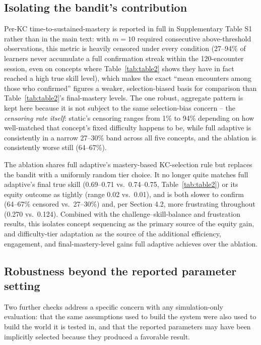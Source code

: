 \documentclass[11pt]{article}
\begin{document}
\subsection{Isolating the bandit's contribution}

Per-KC time-to-sustained-mastery is reported in full in Supplementary Table S1 rather than in the main text: with $m{=}10$ required consecutive above-threshold observations, this metric is heavily censored under every condition (27--94\% of learners never accumulate a full confirmation streak within the 120-encounter session, even on concepts where Table~\ref{tab:table2} shows they have in fact reached a high true skill level), which makes the exact ``mean encounters among those who confirmed'' figures a weaker, selection-biased basis for comparison than Table~\ref{tab:table2}'s final-mastery levels. The one robust, aggregate pattern is kept here because it is not subject to the same selection-bias concern -- the \textit{censoring rate itself}: static's censoring ranges from 1\% to 94\% depending on how well-matched that concept's fixed difficulty happens to be, while full adaptive is consistently in a narrow 27--30\% band across all five concepts, and the ablation is consistently worse still (64--67\%).

The ablation shares full adaptive's mastery-based KC-selection rule but replaces the bandit with a uniformly random tier choice. It no longer quite matches full adaptive's final true skill (0.69--0.71 vs.\ 0.74--0.75, Table~\ref{tab:table2}) or its equity outcome as tightly (range 0.02 vs.\ 0.01), and is both slower to confirm (64--67\% censored vs.\ 27--30\%) and, per Section 4.2, more frustrating throughout (0.270 vs.\ 0.124). Combined with the challenge--skill-balance and frustration results, this isolates concept sequencing as the primary source of the equity gain, and difficulty-tier adaptation as the source of the additional efficiency, engagement, and final-mastery-level gains full adaptive achieves over the ablation.

\subsection{Robustness beyond the reported parameter setting}

Two further checks address a specific concern with any simulation-only evaluation: that the same assumptions used to build the system were also used to build the world it is tested in, and that the reported parameters may have been implicitly selected because they produced a favorable result.
\end{document}
